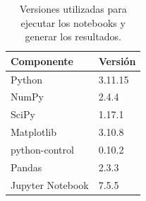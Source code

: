 \begin{table}[H]
\centering
\caption{Versiones utilizadas para ejecutar los notebooks y generar los resultados.}
\label{tab:versiones}
\begin{tabular}{ll}
\toprule
Componente & Versión \\
\midrule
Python & 3.11.15 \\
NumPy & 2.4.4 \\
SciPy & 1.17.1 \\
Matplotlib & 3.10.8 \\
python-control & 0.10.2 \\
Pandas & 2.3.3 \\
Jupyter Notebook & 7.5.5 \\
\bottomrule
\end{tabular}
\end{table}
